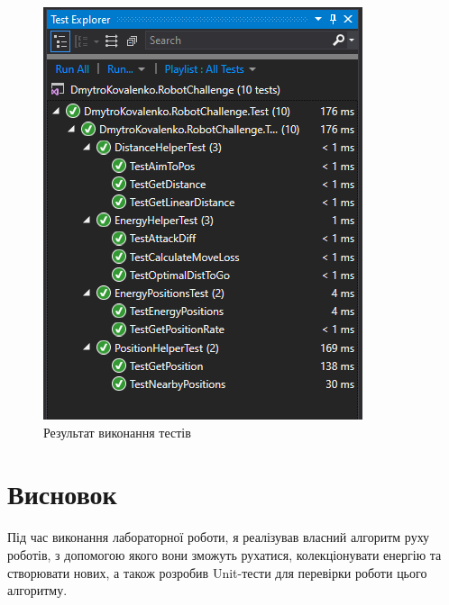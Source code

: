 \documentclass[14pt]{extreport}
\begin{document}
\begin{normalsize}
	\begin{figure}[H]
		\centering
		\includegraphics[scale=1]{1}
		\caption{Результат виконання тестів}
	\end{figure}
	
	\section*{Висновок}
	Під час виконання лабораторної роботи, я реалізував власний алгоритм руху роботів, з допомогою якого вони зможуть рухатися, колекціонувати енергію та створювати нових, а також розробив Unit-тести для перевірки роботи цього алгоритму.
	
	 
\end{normalsize}
\end{document}
